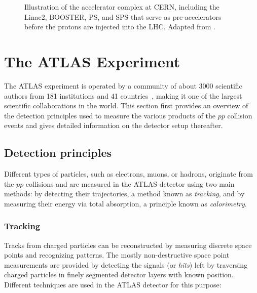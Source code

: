 \FloatBarrier





\begin{figure}
    \caption{Illustration of the accelerator complex at CERN, including the Linac2, BOOSTER, PS, and SPS that serve as pre-accelerators before the protons are injected into the LHC. Adapted from .}
    \label{fig:accelerator-complex}
\end{figure}







\section{The ATLAS Experiment}
The ATLAS experiment is operated by a community of about 3000 scientific authors from 181 institutions and 41 countries~\cite{AtlasCollab}, making it one of the largest scientific collaborations in the world.
This section first provides an overview of the detection principles used to measure the various products of the $pp$ collision events and gives detailed information on the detector setup thereafter.

\subsection{Detection principles}
\label{subsec:measurement-principles}
Different types of particles, such as electrons, muons, or hadrons, originate from the $pp$ collisions and are measured in the ATLAS detector using two main methods: by detecting their trajectories, a method known as \emph{tracking}, and by measuring their energy via total absorption, a principle known as \emph{calorimetry}.

\subsubsection{Tracking}
Tracks from charged particles can be reconstructed by measuring discrete space points and recognizing patterns.
The mostly non-destructive space point measurements are provided by detecting the signals (or \emph{hits}) left by traversing charged particles in finely segmented detector layers with known position. Different techniques are used in the ATLAS detector for this purpose:

